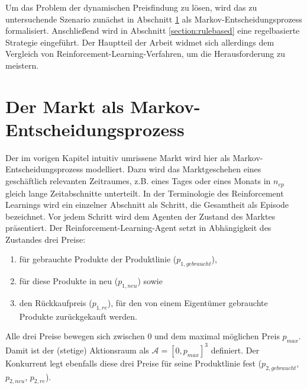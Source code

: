 Um das Problem der dynamischen Preisfindung zu lösen, wird das zu untersuchende Szenario zunächst in Abschnitt \ref{section:markov} als Markov-Entscheidungsprozess formalisiert.
Anschließend wird in Abschnitt \ref{section:rulebased} eine regelbasierte Strategie eingeführt.
Der Hauptteil der Arbeit widmet sich allerdings dem Vergleich von Reinforcement-Learning-Verfahren, um die Herausforderung zu meistern.

\section{Der Markt als Markov-Entscheidungsprozess}
\label{section:markov}
Der im vorigen Kapitel intuitiv umrissene Markt wird hier als Markov-Entscheidungsprozess modelliert.
Dazu wird das Marktgeschehen eines geschäftlich relevanten Zeitraumes, z.B. eines Tages oder eines Monats in $n_{ep}$ gleich lange Zeitabschnitte unterteilt.
In der Terminologie des Reinforcement Learnings wird ein einzelner Abschnitt als Schritt, die Gesamtheit als Episode bezeichnet.
Vor jedem Schritt wird dem Agenten der Zustand des Marktes präsentiert.
Der Reinforcement-Learning-Agent setzt in Abhängigkeit des Zustandes drei Preise:
\begin{enumerate}
	\item für gebrauchte Produkte der Produktlinie ($p_{1, gebraucht}$),
	\item für diese Produkte in neu ($p_{1, neu}$) sowie
	\item den Rückkaufpreis ($p_{1, re}$), für den von einem Eigentümer gebrauchte Produkte zurückgekauft werden.
\end{enumerate}
Alle drei Preise bewegen sich zwischen 0 und dem maximal möglichen Preis $p_{max}$.
Damit ist der (stetige) Aktionsraum als $\mathcal{A}=[0, p_{max}]^3$ definiert.
Der Konkurrent legt ebenfalls diese drei Preise für seine Produktlinie fest ($p_{2, gebraucht}$, $p_{2, neu}$, $p_{2, re}$).

